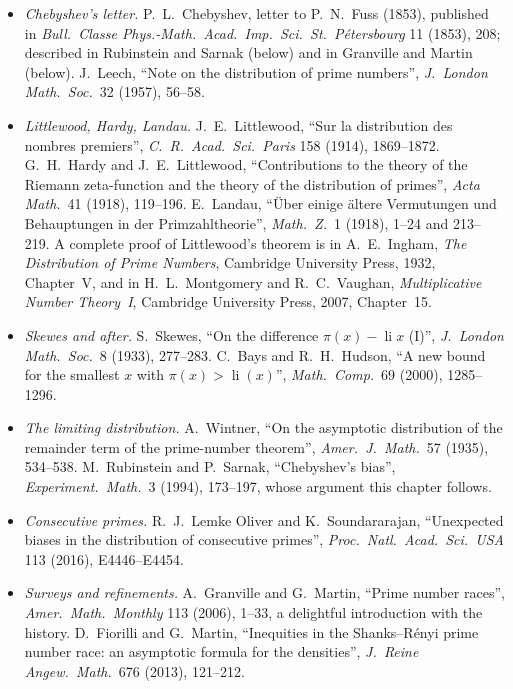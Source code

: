 \begin{itemize}
\item \emph{Chebyshev's letter.} P.~L.~Chebyshev, letter to P.~N.~Fuss (1853), published in \emph{Bull.\ Classe Phys.-Math.\ Acad.\ Imp.\ Sci.\ St.\ Pétersbourg} 11 (1853), 208; described in Rubinstein and Sarnak (below) and in Granville and Martin (below). J.~Leech, ``Note on the distribution of prime numbers'', \emph{J.\ London Math.\ Soc.}\ 32 (1957), 56--58.
\item \emph{Littlewood, Hardy, Landau.} J.~E.~Littlewood, ``Sur la distribution des nombres premiers'', \emph{C.\ R.\ Acad.\ Sci.\ Paris} 158 (1914), 1869--1872. G.~H.~Hardy and J.~E.~Littlewood, ``Contributions to the theory of the Riemann zeta-function and the theory of the distribution of primes'', \emph{Acta Math.}\ 41 (1918), 119--196. E.~Landau, ``Über einige ältere Vermutungen und Behauptungen in der Primzahltheorie'', \emph{Math.\ Z.}\ 1 (1918), 1--24 and 213--219. A complete proof of Littlewood's theorem is in A.~E.~Ingham, \emph{The Distribution of Prime Numbers}, Cambridge University Press, 1932, Chapter~V, and in H.~L.~Montgomery and R.~C.~Vaughan, \emph{Multiplicative Number Theory~I}, Cambridge University Press, 2007, Chapter~15.
\item \emph{Skewes and after.} S.~Skewes, ``On the difference $\pi(x)-\operatorname{li}x$ (I)'', \emph{J.\ London Math.\ Soc.}\ 8 (1933), 277--283. C.~Bays and R.~H.~Hudson, ``A new bound for the smallest $x$ with $\pi(x)>\operatorname{li}(x)$'', \emph{Math.\ Comp.}\ 69 (2000), 1285--1296.
\item \emph{The limiting distribution.} A.~Wintner, ``On the asymptotic distribution of the remainder term of the prime-number theorem'', \emph{Amer.\ J.\ Math.}\ 57 (1935), 534--538. M.~Rubinstein and P.~Sarnak, ``Chebyshev's bias'', \emph{Experiment.\ Math.}\ 3 (1994), 173--197, whose argument this chapter follows.
\item \emph{Consecutive primes.} R.~J.~Lemke Oliver and K.~Soundararajan, ``Unexpected biases in the distribution of consecutive primes'', \emph{Proc.\ Natl.\ Acad.\ Sci.\ USA} 113 (2016), E4446--E4454.
\item \emph{Surveys and refinements.} A.~Granville and G.~Martin, ``Prime number races'', \emph{Amer.\ Math.\ Monthly} 113 (2006), 1--33, a delightful introduction with the history. D.~Fiorilli and G.~Martin, ``Inequities in the Shanks--Rényi prime number race: an asymptotic formula for the densities'', \emph{J.\ Reine Angew.\ Math.}\ 676 (2013), 121--212.
\end{itemize}
